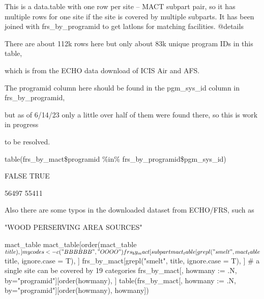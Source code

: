 \documentclass[a4paper]{book}
\begin{document}
%
\begin{Description}\relax
This is a data.table with one row per site -- MACT subpart pair,
so it has multiple rows for one site if the site is covered by multiple subparts. It has been joined with frs\_by\_programid to get latlons for matching facilities.
@details

There are about 112k rows here but only about 83k unique program IDs in this table,

which is from the ECHO data download of ICIS Air and AFS.

The programid column here should be found in the pgm\_sys\_id column in frs\_by\_programid,

but as of 6/14/23 only a little over half of them were found there, so this is work in progress

to be resolved.

table(frs\_by\_mact\$programid \%in\% frs\_by\_programid\$pgm\_sys\_id)

FALSE  TRUE

56497 55411

Also there are some typos in the downloaded dataset from ECHO/FRS, such as

"WOOD PERSERVING AREA SOURCES"
\end{Description}
%
\begin{SeeAlso}\relax
{}   
\end{SeeAlso}
%
\begin{Examples}
\begin{ExampleCode}
 
  mact_table
  mact_table[order(mact_table$title),]
  mycodes <- c("BBBBBB", "OOOO")
  frs_by_mact[subpart %
  mact_table[grepl("smelt", mact_table$title, ignore.case = T), ]
  frs_by_mact[grepl("smelt", title, ignore.case = T), ]
  # a single site can be covered by 19 categories
  frs_by_mact[, howmany := .N, by="programid"][order(howmany), ] 
  table(frs_by_mact[, howmany := .N, by="programid"][order(howmany), howmany])
  
\end{ExampleCode}
\end{Examples}
\end{document}
